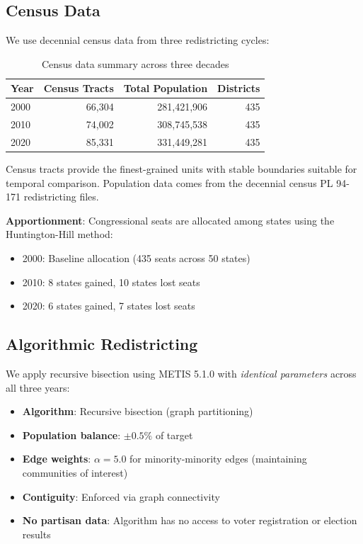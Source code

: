
\subsection{Census Data}

We use decennial census data from three redistricting cycles:

\begin{table}[h]
\centering
\begin{tabular}{lrrr}
\toprule
\textbf{Year} & \textbf{Census Tracts} & \textbf{Total Population} & \textbf{Districts} \\
\midrule
2000 & 66,304 & 281,421,906 & 435 \\
2010 & 74,002 & 308,745,538 & 435 \\
2020 & 85,331 & 331,449,281 & 435 \\
\bottomrule
\end{tabular}
\caption{Census data summary across three decades}
\end{table}

Census tracts provide the finest-grained units with stable boundaries suitable for temporal comparison. Population data comes from the decennial census PL 94-171 redistricting files.

\textbf{Apportionment}: Congressional seats are allocated among states using the Huntington-Hill method:
\begin{itemize}
    \item 2000: Baseline allocation (435 seats across 50 states)
    \item 2010: 8 states gained, 10 states lost seats
    \item 2020: 6 states gained, 7 states lost seats
\end{itemize}

\subsection{Algorithmic Redistricting}

We apply recursive bisection using METIS 5.1.0 with \textit{identical parameters} across all three years:

\begin{itemize}
    \item \textbf{Algorithm}: Recursive bisection (graph partitioning)
    \item \textbf{Population balance}: $\pm0.5\%$ of target
    \item \textbf{Edge weights}: $\alpha = 5.0$ for minority-minority edges (maintaining communities of interest)
    \item \textbf{Contiguity}: Enforced via graph connectivity
    \item \textbf{No partisan data}: Algorithm has no access to voter registration or election results
\end{itemize}


